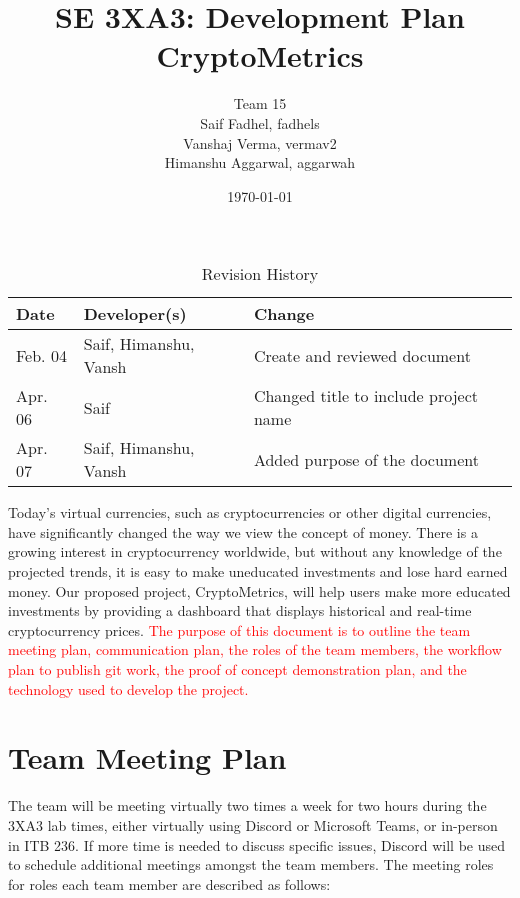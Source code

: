 \documentclass[12pt,fleqn]{article}
\title{SE 3XA3: Development Plan\\CryptoMetrics}
\author{Team 15
		\\ Saif Fadhel, fadhels
		\\ Vanshaj Verma, vermav2
		\\ Himanshu Aggarwal, aggarwah
}
\date{\today}
\begin{document}
\maketitle
\vspace*{\fill}
\begin{table}[hp]
\centering
\caption{Revision History} \label{TblRevisionHistory}
\begin{tabularx}{\textwidth}{llX}
\toprule
\textbf{Date} & \textbf{Developer(s)} & \textbf{Change}\\
\midrule
Feb. 04 & Saif, Himanshu, Vansh & Create and reviewed document\\
\midrule
Apr. 06 & Saif & Changed title to include project name\\
\midrule
Apr. 07 & Saif, Himanshu, Vansh & Added purpose of the document\\
\bottomrule
\end{tabularx}
\end{table}
\vspace*{\fill}


\newpage

\maketitle
\thispagestyle{empty}
\pagebreak

\noindent Today's virtual currencies, such as cryptocurrencies or other digital currencies, have significantly changed the way we view the concept of money. There is a growing interest in cryptocurrency worldwide, but without any knowledge of the projected trends, it is easy to make uneducated investments and lose hard earned money. Our proposed project, CryptoMetrics, will help users make more educated investments by providing a dashboard that displays historical and real-time cryptocurrency prices. \textcolor{red}{The purpose of this document is to outline the team meeting plan, communication plan, the roles of the team members, the workflow plan to publish git work, the proof of concept demonstration plan, and the technology used to develop the project.} 

\section{Team Meeting Plan}
\noindent The team will be meeting virtually two times a week for two hours during the 3XA3 lab times, either virtually using Discord or Microsoft Teams, or in-person in ITB 236. If more time is needed to discuss specific issues, Discord will be used to schedule additional meetings amongst the team members. The meeting roles for roles each team member are described as follows: \\
\end{document}
